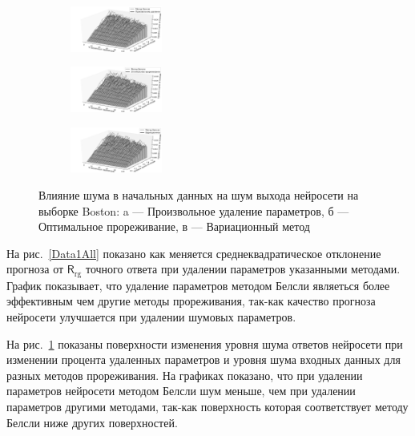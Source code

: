 \begin{figure}[ht]\center
\begin{subfigure}[а]{0.33\textwidth}
\includegraphics[width=0.33\textwidth]{plots/grabovoy/synt_random.pdf}
\end{subfigure}
\begin{subfigure}[б]{0.33\textwidth}
{\includegraphics[width=0.33\textwidth]{plots/grabovoy/synt_obd.pdf}}
\end{subfigure}
\begin{subfigure}[в]{0.33\textwidth}
{\includegraphics[width=0.33\textwidth]{plots/grabovoy/synt_var.pdf}}
\end{subfigure}

\caption{Влияние шума в начальных данных на шум выхода нейросети на выборке Boston: a --- Произвольное удаление параметров, б --- Оптимальное прореживание, в --- Вариационный метод}
\label{Data1Noise}
\end{figure}
На рис.~\ref{Data1All} показано как меняется среднеквадратическое отклонение прогноза от $\mathsf{R}_{\text{rg}}$ точного ответа при удалении параметров указанными методами. График показывает, что удаление параметров методом Белсли являеться более эффективным чем другие методы прореживания, так-как качество прогноза нейросети улучшается при удалении шумовых параметров.

На рис.~\ref{Data1Noise} показаны поверхности изменения уровня шума ответов нейросети при изменении процента удаленных параметров и уровня шума входных данных для разных методов прореживания. На графиках показано, что при удалении параметров нейросети методом Белсли шум меньше, чем при удалении параметров другими методами, так-как поверхность которая соответствует методу Белсли ниже других поверхностей.



